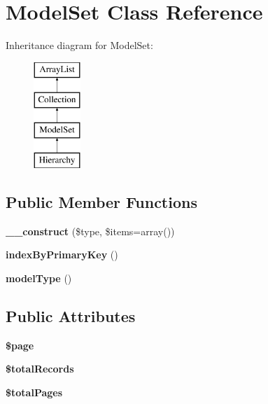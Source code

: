 \hypertarget{classModelSet}{
\section{ModelSet Class Reference}
\label{classModelSet}
}
Inheritance diagram for ModelSet:\begin{figure}[H]
\begin{center}
\leavevmode
\includegraphics[height=4.000000cm]{classModelSet}
\end{center}
\end{figure}
\subsection*{Public Member Functions}
\begin{DoxyCompactItemize}
\item 
\hypertarget{classModelSet_a6ef5b27fef9ca28c199406f1fa28196b}{
{\bfseries \_\-\_\-construct} (\$type, \$items=array())}
\label{classModelSet_a6ef5b27fef9ca28c199406f1fa28196b}

\item 
\hypertarget{classModelSet_a03ff908145b99b02632812bdc2b7a220}{
{\bfseries indexByPrimaryKey} ()}
\label{classModelSet_a03ff908145b99b02632812bdc2b7a220}

\item 
\hypertarget{classModelSet_abe754b2c3335cb3a72a9d40007a9292b}{
{\bfseries modelType} ()}
\label{classModelSet_abe754b2c3335cb3a72a9d40007a9292b}

\end{DoxyCompactItemize}
\subsection*{Public Attributes}
\begin{DoxyCompactItemize}
\item 
\hypertarget{classModelSet_ab643357981e3f0e1f40a50ac7d58e910}{
{\bfseries \$page}}
\label{classModelSet_ab643357981e3f0e1f40a50ac7d58e910}

\item 
\hypertarget{classModelSet_aedb5b2f515cf6326856f33fa1467516a}{
{\bfseries \$totalRecords}}
\label{classModelSet_aedb5b2f515cf6326856f33fa1467516a}

\item 
\hypertarget{classModelSet_a9907957a89c74c9b5c413ee196d80ed7}{
{\bfseries \$totalPages}}
\label{classModelSet_a9907957a89c74c9b5c413ee196d80ed7}

\end{DoxyCompactItemize}
